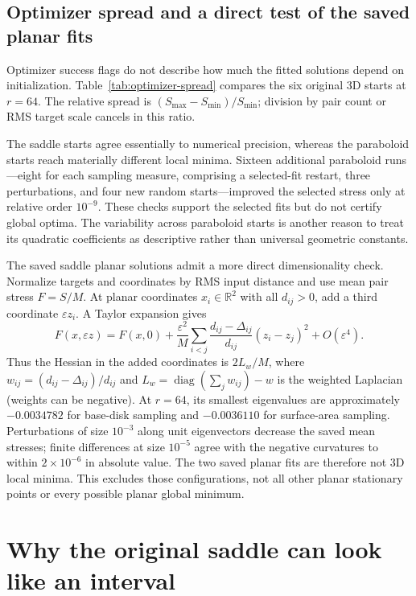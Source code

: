 \documentclass[11pt]{article}
\theoremstyle{remark}\newtheorem{remark}[proposition]{Remark}
\newcommand{\R}{\mathbb R}
\newcommand{\diag}{\operatorname{diag}}
\begin{document}
\subsection{Optimizer spread and a direct test of the saved planar fits}
Optimizer success flags do not describe how much the fitted solutions depend
on initialization. Table~\ref{tab:optimizer-spread} compares the six original
3D starts at $r=64$. The relative spread is $(S_{\max}-S_{\min})/S_{\min}$;
division by pair count or RMS target scale cancels in this ratio.

The saddle starts agree essentially to numerical precision, whereas the
paraboloid starts reach materially different local minima. Sixteen additional
paraboloid runs---eight for each sampling measure, comprising a selected-fit
restart, three perturbations, and four new random starts---improved the
selected stress only at relative order $10^{-9}$. These checks support the
selected fits but do not certify global optima. The variability across
paraboloid starts is another reason to treat its quadratic coefficients as
descriptive rather than universal geometric constants.

The saved saddle planar solutions admit a more direct dimensionality check.
Normalize targets and coordinates by RMS input distance and use mean pair
stress $F=S/M$. At planar coordinates $x_i\in\R^2$ with all $d_{ij}>0$, add
a third coordinate $\varepsilon z_i$. A Taylor expansion gives
\begin{equation}
 F(x,\varepsilon z)=F(x,0)+\frac{\varepsilon^2}{M}
 \sum_{i<j}\frac{d_{ij}-\Delta_{ij}}{d_{ij}}(z_i-z_j)^2+O(\varepsilon^4).
\end{equation}
Thus the Hessian in the added coordinates is $2L_w/M$, where
$w_{ij}=(d_{ij}-\Delta_{ij})/d_{ij}$ and
$L_w=\diag(\sum_j w_{ij})-w$ is the weighted Laplacian (weights can be negative).
At $r=64$, its smallest eigenvalues are approximately $-0.0034782$ for
base-disk sampling and $-0.0036110$ for surface-area sampling. Perturbations
of size $10^{-3}$ along unit eigenvectors decrease the saved mean stresses;
finite differences at size $10^{-5}$ agree with the negative curvatures to
within $2\times10^{-6}$ in absolute value. The two saved planar fits are
therefore not 3D local minima. This excludes those configurations, not all
other planar stationary points or every possible planar global minimum.

\section{Why the original saddle can look like an interval}\label{sec:scaling}
\end{document}

